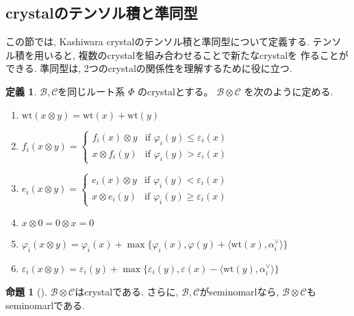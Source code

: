 \documentclass[
  a4paper, 
  12pt,
  ja=standard,
  xelatex,
  left=30truemm,
  right=30truemm,
  titlepage 
]{bxjsarticle}
\theoremstyle{definition}
\newtheorem{df}{定義}
\newtheorem{prop}[thm]{命題}
\begin{document}
%
\subsection{crystalのテンソル積と準同型}
この節では, Kashiwara crystalのテンソル積と準同型について定義する. テンソル積を用いると, 複数のcrystalを組み合わせることで新たなcrystalを
作ることができる. 準同型は, 2つのcrystalの関係性を理解するために役に立つ.
\bigskip

\begin{df}
  $\mathscr{B}, \mathscr{C}$を同じルート系 $\Phi$ のcrystalとする。
  $\mathscr{B} \otimes \mathscr{C}$ を次のように定める.
  \begin{enumerate}
    \item $\mathrm{wt}(x \otimes y) = \mathrm{wt}(x) + \mathrm{wt}(y)$
    \item $f_i(x \otimes y) = 
    \begin{cases} 
      f_i(x) \otimes y & \text{if } \varphi_i(y) \leq \varepsilon_i(x) \\
      x \otimes f_i(y) & \text{if } \varphi_i(y) > \varepsilon_i(x)
    \end{cases}$
    \item $e_i(x \otimes y) = 
    \begin{cases} 
      e_i(x) \otimes y & \text{if } \varphi_i(y) < \varepsilon_i(x) \\
      x \otimes e_i(y) & \text{if } \varphi_i(y) \geq \varepsilon_i(x)
    \end{cases}$
    \item $x \otimes 0 = 0 \otimes x = 0$
    \item $\varphi_i(x \otimes y) = \varphi_i(x) + \max\{ \varphi_i(x), \varphi(y) + \langle \mathrm{wt}(x), \alpha_i^{ \vee } \rangle \} $
    \item $\varepsilon_i(x \otimes y) = \varepsilon_i(y) + \max\{ \varepsilon_i(y), \varepsilon(x) - \langle \mathrm{wt}(y), \alpha_i^{ \vee } \rangle \} $
  \end{enumerate}
\end{df}

\begin{prop}[{\cite[命題2.29]{b1}}]
  $\mathscr{B} \otimes \mathscr{C}$はcrystalである. さらに, $\mathscr{B}, \mathscr{C}$がseminomarlなら, $\mathscr{B} \otimes \mathscr{C}$もseminomarlである. 
\end{prop}
\end{document}

